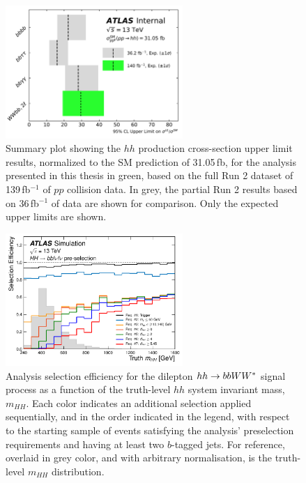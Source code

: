 \begin{figure}[!htb]
    \begin{center}
        \includegraphics[width=0.6\textwidth]{figures/search_hh/results/hh_ul_compPDF}
        \caption{
            Summary plot showing the $hh$ production cross-section upper limit results, normalized to
            the SM prediction of 31.05\,fb, for the analysis presented in this thesis in green,
            based on the full Run 2 dataset of 139\,fb$^{-1}$ of $pp$ collision data.
            In grey, the partial Run 2 results based on 36\,fb$^{-1}$ of data are shown for comparison.
            Only the expected upper limits are shown.
        }
        \label{fig:hh_ul_comp}
    \end{center}
\end{figure}

\begin{figure}[!htb]
    \begin{center}
        \includegraphics[width=0.6\textwidth]{figures/search_hh/mhh_sel_eff_nice_jul30}
        \caption{
            Analysis selection efficiency for the dilepton $hh \rightarrow bbWW^*$ signal process
            as a function of the truth-level $hh$ system invariant mass, $m_{HH}$.
            Each color indicates an additional selection applied sequentially, and in the order indicated
            in the legend, with respect to the starting sample of events satisfying the
            analysis' preselection requirements and having at least two $b$-tagged jets.
            For reference, overlaid in grey color, and with arbitrary normalisation, is the truth-level
            $m_{HH}$ distribution.
        }
        \label{fig:mhh_sel_eff}
    \end{center}
\end{figure}

